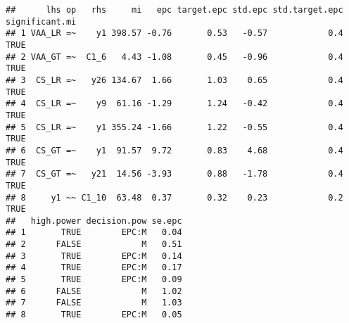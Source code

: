 \documentclass[
]{article}
\newenvironment{Shaded}{\begin{snugshade}}{\end{snugshade}}
\newcommand{\CommentTok}[1]{\textcolor[rgb]{0.56,0.35,0.01}{\textit{#1}}}
\newcommand{\ControlFlowTok}[1]{\textcolor[rgb]{0.13,0.29,0.53}{\textbf{#1}}}
\newcommand{\DecValTok}[1]{\textcolor[rgb]{0.00,0.00,0.81}{#1}}
\newcommand{\KeywordTok}[1]{\textcolor[rgb]{0.13,0.29,0.53}{\textbf{#1}}}
\newcommand{\NormalTok}[1]{#1}
\newcommand{\OperatorTok}[1]{\textcolor[rgb]{0.81,0.36,0.00}{\textbf{#1}}}
\newcommand{\StringTok}[1]{\textcolor[rgb]{0.31,0.60,0.02}{#1}}
\begin{document}
\begin{Shaded}
\end{Shaded}

\begin{verbatim}
##      lhs op   rhs     mi   epc target.epc std.epc std.target.epc significant.mi
## 1 VAA_LR =~    y1 398.57 -0.76       0.53   -0.57            0.4           TRUE
## 2 VAA_GT =~  C1_6   4.43 -1.08       0.45   -0.96            0.4           TRUE
## 3  CS_LR =~   y26 134.67  1.66       1.03    0.65            0.4           TRUE
## 4  CS_LR =~    y9  61.16 -1.29       1.24   -0.42            0.4           TRUE
## 5  CS_LR =~    y1 355.24 -1.66       1.22   -0.55            0.4           TRUE
## 6  CS_GT =~    y1  91.57  9.72       0.83    4.68            0.4           TRUE
## 7  CS_GT =~   y21  14.56 -3.93       0.88   -1.78            0.4           TRUE
## 8     y1 ~~ C1_10  63.48  0.37       0.32    0.23            0.2           TRUE
##   high.power decision.pow se.epc
## 1       TRUE        EPC:M   0.04
## 2      FALSE            M   0.51
## 3       TRUE        EPC:M   0.14
## 4       TRUE        EPC:M   0.17
## 5       TRUE        EPC:M   0.09
## 6      FALSE            M   1.02
## 7      FALSE            M   1.03
## 8       TRUE        EPC:M   0.05
\end{verbatim}
\end{document}
